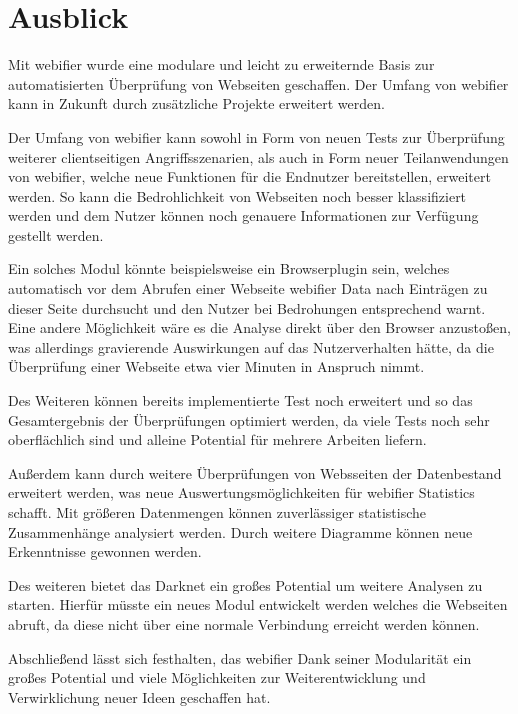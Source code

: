 \chapter{Ausblick}

Mit webifier wurde eine modulare und leicht zu erweiternde Basis zur automatisierten Überprüfung
von Webseiten geschaffen. Der Umfang von webifier kann in Zukunft durch zusätzliche Projekte
erweitert werden.

Der Umfang von webifier kann sowohl in Form von neuen Tests zur Überprüfung weiterer clientseitigen
Angriffsszenarien, als auch in Form neuer Teilanwendungen von webifier, welche neue Funktionen für
die Endnutzer bereitstellen, erweitert werden. So kann die Bedrohlichkeit von Webseiten noch besser
klassifiziert werden und dem Nutzer können noch genauere Informationen zur Verfügung gestellt
werden.

Ein solches Modul könnte beispielsweise ein Browserplugin sein, welches automatisch vor dem Abrufen
einer Webseite webifier Data nach Einträgen zu dieser Seite durchsucht und den Nutzer bei
Bedrohungen entsprechend warnt. Eine andere Möglichkeit wäre es die Analyse direkt über den Browser
anzustoßen, was allerdings gravierende Auswirkungen auf das Nutzerverhalten hätte, da die
Überprüfung einer Webseite etwa vier Minuten in Anspruch nimmt.

Des Weiteren können bereits implementierte Test noch erweitert und so das Gesamtergebnis der
Überprüfungen optimiert werden, da viele Tests noch sehr oberflächlich sind und alleine Potential
für mehrere Arbeiten liefern.

Außerdem kann durch weitere Überprüfungen von Websseiten der Datenbestand erweitert werden, was neue
Auswertungsmöglichkeiten für webifier Statistics schafft. Mit größeren Datenmengen können
zuverlässiger statistische Zusammenhänge analysiert werden. Durch weitere Diagramme können neue
Erkenntnisse gewonnen werden.

Des weiteren bietet das Darknet ein großes Potential um weitere Analysen zu starten. Hierfür
müsste ein neues Modul entwickelt werden welches die Webseiten abruft, da diese nicht über eine
normale Verbindung erreicht werden können.

Abschließend lässt sich festhalten, das webifier Dank seiner Modularität ein großes Potential und
viele Möglichkeiten zur Weiterentwicklung und Verwirklichung neuer Ideen geschaffen hat.
